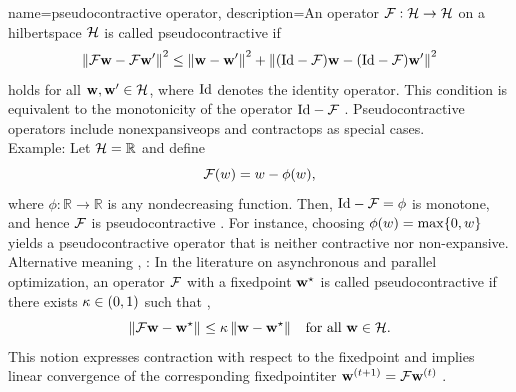 {name={pseudocontractive operator},
	description={An \gls{operator}
		$\mathcal{F}:\mathcal{H}\rightarrow\mathcal{H}$ on a \gls{hilbertspace}
		$\mathcal{H}$ is called pseudocontractive if \cite{BausckeCombette}
		\begin{equation}
			\nonumber
			\normgeneric{\fixedpointop\weights-\fixedpointop\weights'}{}^{2}
			\le
			\normgeneric{\weights-\weights'}{}^{2}
			+
			\normgeneric{(\identityop-\fixedpointop)\weights
			-(\identityop-\fixedpointop)\weights'}{}^{2}
		\end{equation}
		holds for all ${\bf w},{\bf w}'\in\mathcal{H}$, where
		$\mathrm{Id}$ denotes the identity \gls{operator}.
		This condition is equivalent to the monotonicity of the \gls{operator}
		$\mathrm{Id}-\mathcal{F}$ \cite[Example 20.8]{BausckeCombette}.
		Pseudocontractive \glspl{operator} include \glspl{nonexpansiveop} and \glspl{contractop} as 
		special cases. 
		\medskip
		\noindent \\
		Example: Let $\mathcal{H}=\mathbb{R}$ and define
		\[
		\mathcal{F}(w)=w-\phi(w),
		\]
		where $\phi:\mathbb{R}\to\mathbb{R}$ is any nondecreasing \gls{function}.
		Then, $\mathrm{Id}-\mathcal{F}=\phi$ is monotone, and hence
		$\mathcal{F}$ is pseudocontractive \cite{BausckeCombette}.
		For instance, choosing $\phi(w)=\max\{0,w\}$ yields a pseudocontractive
		\gls{operator} that is neither contractive nor non-expansive.
		\medskip
		\noindent \\
		Alternative meaning \cite{Feyzmahdavian2023AsynchJMLR}, \cite{ParallelDistrBook}:
		In the literature on asynchronous and parallel \gls{optimization},
		an \gls{operator} $\mathcal{F}$ with a \gls{fixedpoint} ${\bf w}^\star$ is called
		pseudocontractive if there exists $\kappa\in(0,1)$ such that \cite{Feyzmahdavian2023AsynchJMLR}, \cite{ParallelDistrBook}
		\begin{equation}
			\label{equ_pseudocontractive_Bertsekas_dict}
			\normgeneric{\fixedpointop\weights-\weights^\star}{}
			\le
			\contractfac\,\normgeneric{\weights-\weights^\star}{}
			\quad\text{for all }\weights\in\hilbertspace.
		\end{equation}
		This notion expresses contraction with respect to the \gls{fixedpoint} and
		implies linear \gls{convergence} of the corresponding \gls{fixedpointiter}
		${\bf w}^{(t+1)}=\mathcal{F}{\bf w}^{(t)}$ \cite[Proposition 1.2]{ParallelDistrBook}.
		\medskip
		\noindent \\
}}
